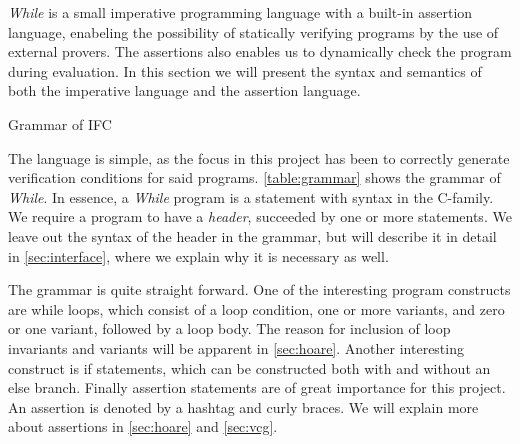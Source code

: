 \textit{While} is a small imperative programming language with a built-in assertion language, enabeling the possibility of statically verifying programs by the use of external provers.
The assertions also enables us to dynamically check the program during evaluation.
In this section we will present the syntax and semantics of both the imperative language and the assertion language.


\begin{table}[h!]

\caption{Grammar of IFC}
\label{table:grammar}
\end{table}

The language is simple, as the focus in this project has been to correctly generate verification conditions for said programs.
\cref{table:grammar} shows the grammar of \textit{While}. 
In essence, a \textit{While} program is a statement with syntax in the C-family. 
We require a program to have a \textit{header}, succeeded by one or more statements.
We leave out the syntax of the header in the grammar, but will describe it in detail in \cref{sec:interface}, where we explain why it is necessary as well.

The grammar is quite straight forward. 
One of the interesting program constructs are while loops, which consist of a loop condition, one or more variants, and zero or one variant, followed by a loop body. The reason for inclusion of loop invariants and variants will be apparent in \cref{sec:hoare}.
Another interesting construct is if statements, which can be constructed both with and without an else branch.
Finally assertion statements are of great importance for this project. An assertion is denoted by a hashtag and curly braces. We will explain more about assertions in \cref{sec:hoare} and \cref{sec:vcg}.

